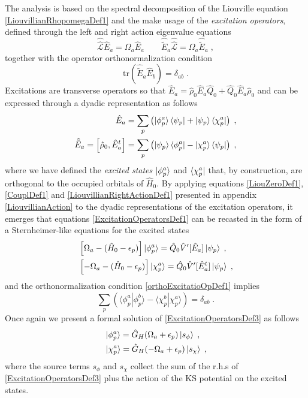 \documentclass[reprint,aps,prb]{revtex4-1}
\newcommand{\eps}{\epsilon}
\newcommand{\be}{\begin{equation}}
\newcommand{\ee}{\end{equation}}
\newcommand{\nn}{\notag}
\newcommand{\qq}{\qquad}
\newcommand{\lb}{\label}
\newcommand{\op}[1]{\hat {#1}}
\newcommand{\sop}[1]{\op{\op {#1}}}
\newcommand{\commutator}[2]{\left[ {#1} , {#2} \right]}
\newcommand{\trace}[1]{\mathrm{tr}\left(#1\right)}
\newcommand{\brket}[2]{\langle  #1 | #2 \rangle} %
\newcommand{\dmnot}{\op{\rho}_0}
\newcommand{\hnot}{\op{H}_0}
\newcommand{\Liouv}{\sop{\mathcal L}}
\begin{document}
The analysis is based on the spectral decomposition of the Liouville equation \eqref{LiouvillianRhopomegaDef1} and the make usage of the \emph{excitation operators}, defined through the 
left and right action eigenvalue equations 
\be\lb{ExcitationOperatorsDef1}
\Liouv \op E_a = \Omega_a \op E_a \qq \op{\tilde E}_a \Liouv = \Omega_a \op{\tilde E}_a \;,
\ee
together with the operator orthonormalization condition %
\be\lb{orthoExcitatioOpDef1}
\trace{\op{\tilde E}_a\op E_b} = \delta_{ab} \;.
\ee
Excitations are transverse operators so that $\op E_a = \dmnot\op E_a\op Q_0 + \op Q_0\op E_a\dmnot$ and can be expressed through a dyadic representation as follows
\begin{align}\lb{ExcitationOperatorsDef2}
\op E_a &= \sum_p \left( \ket{\phi^a_p}\bra{\psi_p} + \ket{\psi_p} \bra{\chi^a_p}\right)\;, \nn \\
\op{\tilde E}_a = \commutator{\dmnot}{\op E^t_a} &= \sum_p \left( \ket{\psi_p}\bra{\phi^a_p} - \ket{\chi^a_p} \bra{\psi_p}\right)\;,
\end{align}
where we have defined the \emph{excited states} $\ket{\phi^a_p}$ and $\bra{\chi^a_p}$ that, by construction, are orthogonal to the occupied orbitals of $\hnot$. 
By applying equations \eqref{LiouZeroDef1},\eqref{CouplDef1} and \eqref{LiouvillianRightActionDef1} presented in appendix \ref{LiouvillianAction} to the dyadic representations of the excitation 
operators, it emerges that equations \eqref{ExcitationOperatorsDef1} can be recasted in the form of a Sternheimer-like equations for the excited states 
\begin{align}\lb{ExcitationOperatorsDef3}
&\left[\Omega_a-(\hnot - \eps_p)\right] \ket{\phi_p^a} = \op Q_0 \op V'[\op E_a] \ket{\psi_p} \;, \nn\\
&\left[-\Omega_a-(\hnot - \eps_p)\right]\ket{\chi_p^a} = \op Q_0\op V'[\op E^t_a]\ket{\psi_p}  \;, 
\end{align}
and the orthonormalization condition \eqref{orthoExcitatioOpDef1} implies 
\be\lb{ExcitedStateOrthNormDef1}
\sum_p \left(\brket{\phi_p^a}{\phi_p^b} - \brket{\chi_p^b}{\chi_p^a}\right) = \delta_{ab} \;. 
\ee
Once again we present a formal solution of \eqref{ExcitationOperatorsDef3} as follows 
\begin{align}
&\ket{\phi^a_p} = \op G_H(\Omega_a+\eps_p)\ket{s_{\phi}} \;, \nn \\
&\ket{\chi^a_p} = \op G_H(-\Omega_a+\eps_p)\ket{s_{\chi}} \;,
\end{align}
where the source terms $s_\phi$ and $s_{\chi}$ collect the sum of the r.h.s of \eqref{ExcitationOperatorsDef3} plus the action of the KS potential on the excited states. 
\end{document}
